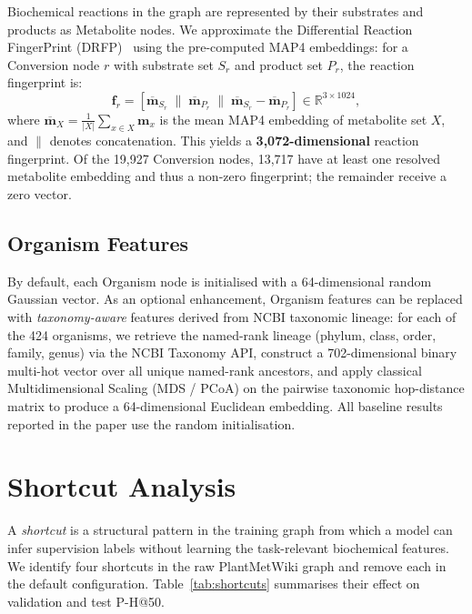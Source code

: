 Biochemical reactions in the graph are represented by their substrates and products as
Metabolite nodes.
We approximate the Differential Reaction FingerPrint
(DRFP)~\cite{Probst2022} using the pre-computed MAP4 embeddings:
for a Conversion node $r$ with substrate set $S_r$ and product set $P_r$,
the reaction fingerprint is:
\begin{equation}
  \mathbf{f}_r
  = \left[
      \overline{\mathbf{m}}_{S_r}
      \;\|\;
      \overline{\mathbf{m}}_{P_r}
      \;\|\;
      \overline{\mathbf{m}}_{S_r} - \overline{\mathbf{m}}_{P_r}
    \right]
  \in \mathbb{R}^{3 \times 1024},
\end{equation}
where $\overline{\mathbf{m}}_X = \frac{1}{|X|}\sum_{x \in X}\mathbf{m}_x$
is the mean MAP4 embedding of metabolite set $X$, and $\|$ denotes
concatenation.
This yields a \textbf{3,072-dimensional} reaction fingerprint.
Of the 19,927 Conversion nodes, 13,717 have at least one resolved
metabolite embedding and thus a non-zero fingerprint; the remainder receive a
zero vector.

\subsection{Organism Features}

By default, each Organism node is initialised with a 64-dimensional random
Gaussian vector.
As an optional enhancement, Organism features can be replaced with
\emph{taxonomy-aware} features derived from NCBI taxonomic lineage:
for each of the 424 organisms, we retrieve the named-rank lineage
(phylum, class, order, family, genus) via the NCBI Taxonomy API, construct
a 702-dimensional binary multi-hot vector over all unique named-rank ancestors,
and apply classical Multidimensional Scaling (MDS / PCoA) on the pairwise
taxonomic hop-distance matrix to produce a 64-dimensional Euclidean
embedding.
All baseline results reported in the paper use the random initialisation.


\section{Shortcut Analysis}
\label{app:shortcuts}

A \emph{shortcut} is a structural pattern in the training graph from which a
model can infer supervision labels without learning the task-relevant biochemical
features.
We identify four shortcuts in the raw PlantMetWiki graph and remove each in the
default configuration.
Table~\ref{tab:shortcuts} summarises their effect on validation and test P-H@50.


